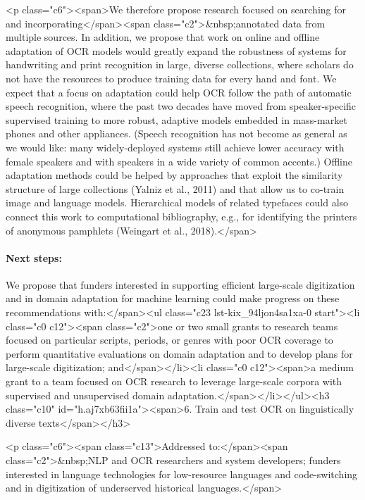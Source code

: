 \documentclass[twoside,11pt]{report}
\begin{document}
<p class="c6"><span>We therefore propose research focused on searching for and incorporating</span><span class="c2">&nbsp;annotated data from multiple sources. In addition, we propose that work on online and offline adaptation of OCR models would greatly expand the robustness of systems for handwriting and print recognition in large, diverse collections, where scholars do not have the resources to produce training data for every hand and font. We expect that a focus on adaptation could help OCR follow the path of automatic speech recognition, where the past two decades have moved from speaker-specific supervised training to more robust, adaptive models embedded in mass-market phones and other appliances. (Speech recognition has not become as general as we would like: many widely-deployed systems still achieve lower accuracy with female speakers and with speakers in a wide variety of common accents.) Offline adaptation methods could be helped by approaches that exploit the similarity structure of large collections (Yalniz et al., 2011) and that allow us to co-train image and language models. Hierarchical models of related typefaces could also connect this work to computational bibliography, e.g., for identifying the printers of anonymous pamphlets (Weingart et al., 2018).</span>

\paragraph{Next steps:} We propose that funders interested in supporting efficient large-scale digitization and in domain adaptation for machine learning could make progress on these recommendations with:</span><ul class="c23 lst-kix_94ljon4sa1xa-0 start"><li class="c0 c12"><span class="c2">one or two small grants to research teams focused on particular scripts, periods, or genres with poor OCR coverage to perform quantitative evaluations on domain adaptation and to develop plans for large-scale digitization; and</span></li><li class="c0 c12"><span>a medium grant to a team focused on OCR research to leverage large-scale corpora with supervised and unsupervised domain adaptation.</span></li></ul><h3 class="c10" id="h.aj7xb63fii1a"><span>6. Train and test OCR on linguistically diverse texts</span></h3>

<p class="c6"><span class="c13">Addressed to:</span><span class="c2">&nbsp;NLP and OCR researchers and system developers; funders interested in language technologies for low-resource languages and code-switching and in digitization of underserved historical languages.</span>
\end{document}
